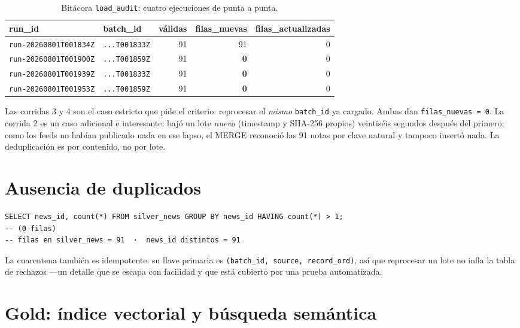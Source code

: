 \documentclass[11pt,a4paper]{article}
\begin{document}
\begin{table}[h]
\centering\small
\caption{Bitácora \texttt{load\_audit}: cuatro ejecuciones de punta a punta.}
\begin{tabular}{@{}llrrr@{}}
\toprule
\textbf{run\_id} & \textbf{batch\_id} & \textbf{válidas} & \textbf{filas\_nuevas} & \textbf{filas\_actualizadas} \\
\midrule
\texttt{run-20260801T001834Z} & \texttt{...T001833Z} & 91 & 91 & 0 \\
\texttt{run-20260801T001900Z} & \texttt{...T001859Z} & 91 & \textbf{0} & 0 \\
\texttt{run-20260801T001939Z} & \texttt{...T001833Z} & 91 & \textbf{0} & 0 \\
\texttt{run-20260801T001953Z} & \texttt{...T001859Z} & 91 & \textbf{0} & 0 \\
\bottomrule
\end{tabular}
\end{table}

Las corridas 3 y 4 son el caso estricto que pide el criterio: reprocesar el
\emph{mismo} \texttt{batch\_id} ya cargado. Ambas dan \texttt{filas\_nuevas = 0}.
La corrida 2 es un caso adicional e interesante: bajó un lote \emph{nuevo}
(timestamp y SHA-256 propios) veintiséis segundos después del primero; como los
feeds no habían publicado nada en ese lapso, el MERGE reconoció las 91 notas por
clave natural y tampoco insertó nada. La deduplicación es por contenido, no por
lote.

\section{Ausencia de duplicados}

\begin{lstlisting}[language=sqlite, caption={Consulta de verificación y su resultado.}]
SELECT news_id, count(*) FROM silver_news GROUP BY news_id HAVING count(*) > 1;
-- (0 filas)
-- filas en silver_news = 91  ·  news_id distintos = 91
\end{lstlisting}

La cuarentena también es idempotente: su llave primaria es
\texttt{(batch\_id, source, record\_ord)}, así que reprocesar un lote no infla la
tabla de rechazos ---un detalle que se escapa con facilidad y que está cubierto
por una prueba automatizada.

\section{Gold: índice vectorial y búsqueda semántica}
\end{document}
